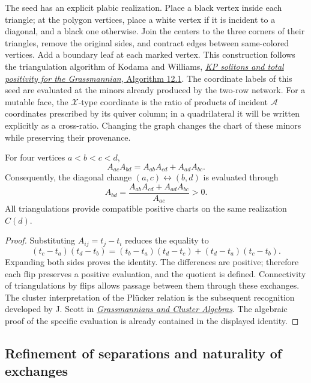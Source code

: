 The seed has an explicit plabic realization. Place a black vertex inside
each triangle; at the polygon vertices, place a white vertex if it is
incident to a diagonal, and a black one otherwise. Join the centers to
the three corners of their triangles, remove the original sides, and
contract edges between same-colored vertices. Add a boundary leaf at
each marked vertex. This construction follows the triangulation
algorithm of Kodama and Williams,
\href{https://people.math.harvard.edu/~williams/papers/KW-ArxivVersion.pdf}
{\emph{KP solitons and total positivity for the Grassmannian}, Algorithm 12.1}.
The coordinate labels of this seed are evaluated at the minors already
produced by the two-row network. For a mutable face, the
\(\mathcal X\)-type coordinate is the ratio of products of incident
\(\mathcal A\) coordinates prescribed by its quiver column; in a
quadrilateral it will be written explicitly as a cross-ratio.
Changing the graph changes the chart of these minors while preserving
their provenance.

\begin{theorem}
\label{thm:nc-ptolemy}
For four vertices \(a<b<c<d\),
\begin{equation}
 A_{ac}A_{bd}=A_{ab}A_{cd}+A_{ad}A_{bc}.
 \label{eq:nc-ptolemy}
\end{equation}
Consequently, the diagonal change \((a,c)\leftrightarrow(b,d)\)
is evaluated through
\[
 A_{bd}=\frac{A_{ab}A_{cd}+A_{ad}A_{bc}}{A_{ac}}>0.
\]
All triangulations provide compatible positive charts on the same
realization \(C(d)\).
\end{theorem}
\begin{proof}
Substituting \(A_{ij}=t_j-t_i\) reduces the equality to
\[
 (t_c-t_a)(t_d-t_b)
 =(t_b-t_a)(t_d-t_c)+(t_d-t_a)(t_c-t_b).
\]
Expanding both sides proves the identity. The differences are positive;
therefore each flip preserves a positive evaluation, and the quotient
is defined. Connectivity of triangulations by flips allows passage
between them through these exchanges. The cluster interpretation of
the Plücker relation is the subsequent recognition developed by
J. Scott in
\href{https://arxiv.org/abs/math/0311148}{\emph{Grassmannians and Cluster
Algebras}}. The algebraic proof of the specific evaluation is already
contained in the displayed identity.
\end{proof}

\subsection{Refinement of separations and naturality of exchanges}

